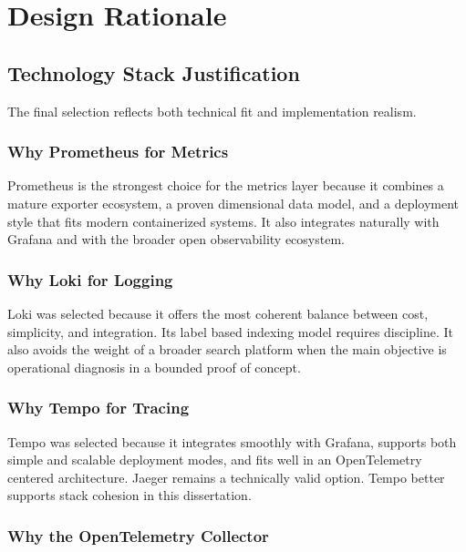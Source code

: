 \section{Design Rationale}
\label{sec:design_rationale}

\subsection{Technology Stack Justification}
\label{subsec:stack_justification}

The final selection reflects both technical fit and implementation realism.

\subsubsection{Why Prometheus for Metrics}
\label{subsubsec:why_prometheus}

Prometheus is the strongest choice for the metrics layer because it combines a mature exporter ecosystem, a proven dimensional data model, and a deployment style that fits modern containerized systems. It also integrates naturally with Grafana and with the broader open observability ecosystem.

\subsubsection{Why Loki for Logging}
\label{subsubsec:why_logging_choice}

Loki was selected because it offers the most coherent balance between cost, simplicity, and integration. Its label based indexing model requires discipline. It also avoids the weight of a broader search platform when the main objective is operational diagnosis in a bounded proof of concept.

\subsubsection{Why Tempo for Tracing}
\label{subsubsec:why_tempo}

Tempo was selected because it integrates smoothly with Grafana, supports both simple and scalable deployment modes, and fits well in an OpenTelemetry centered architecture. Jaeger remains a technically valid option. Tempo better supports stack cohesion in this dissertation.

\subsubsection{Why the OpenTelemetry Collector}
\label{subsubsec:why_collector}

